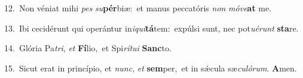 {\numbfont\textcolor{\numbcolor}{12.}}~Non véniat mihi \textit{pes} \textit{su}\-\textbf{pér}biæ:~\star et manus peccatóris \textit{non} \textit{mó}\-\textit{ve}\textbf{at} me.\par
{\numbfont\textcolor{\numbcolor}{13.}}~Ibi cecidérunt qui operántur in\-\textit{i}\-\textit{qui}\textbf{tá}tem:~\star expúlsi sunt, nec pot\-\textit{u}\-\textit{é}\textit{runt} \textbf{sta}\-re.\par
{\numbfont\textcolor{\numbcolor}{14.}}~Glória Pa\-\textit{tri}\-, \textit{et} \textbf{Fí}\-lio,~\star et Spi\-\textit{rí}\-\textit{tu}\textit{i} \textbf{Sanc}\-to.\par
{\numbfont\textcolor{\numbcolor}{15.}}~Sicut erat in princípio, et \textit{nunc}\-, \textit{et} \textbf{sem}\-per,~\star et in sǽcula sæ\-\textit{cu}\-\textit{ló}\textit{rum}. \textbf{A}\-men.\par
